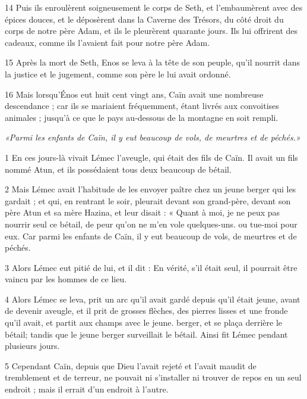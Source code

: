 \par 14 Puis ils enroulèrent soigneusement le corps de Seth, et l'embaumèrent avec des épices douces, et le déposèrent dans la Caverne des Trésors, du côté droit du corps de notre père Adam, et ils le pleurèrent quarante jours. Ils lui offrirent des cadeaux, comme ils l'avaient fait pour notre père Adam.

\par 15 Après la mort de Seth, Enos se leva à la tête de son peuple, qu'il nourrit dans la justice et le jugement, comme son père le lui avait ordonné.

\par 16 Mais lorsqu'Énos eut huit cent vingt ans, Caïn avait une nombreuse descendance ; car ils se mariaient fréquemment, étant livrés aux convoitises animales ; jusqu'à ce que le pays au-dessous de la montagne en soit rempli.


\par \textit{«Parmi les enfants de Caïn, il y eut beaucoup de vols, de meurtres et de péchés.»}

\par 1 En ces jours-là vivait Lémec l'aveugle, qui était des fils de Caïn. Il avait un fils nommé Atun, et ils possédaient tous deux beaucoup de bétail.

\par 2 Mais Lémec avait l'habitude de les envoyer paître chez un jeune berger qui les gardait ; et qui, en rentrant le soir, pleurait devant son grand-père, devant son père Atun et sa mère Hazina, et leur disait : « Quant à moi, je ne peux pas nourrir seul ce bétail, de peur qu'on ne m'en vole quelques-uns. ou tue-moi pour eux. Car parmi les enfants de Caïn, il y eut beaucoup de vols, de meurtres et de péchés.

\par 3 Alors Lémec eut pitié de lui, et il dit : En vérité, s'il était seul, il pourrait être vaincu par les hommes de ce lieu.

\par 4 Alors Lémec se leva, prit un arc qu'il avait gardé depuis qu'il était jeune, avant de devenir aveugle, et il prit de grosses flèches, des pierres lisses et une fronde qu'il avait, et partit aux champs avec le jeune. berger, et se plaça derrière le bétail; tandis que le jeune berger surveillait le bétail. Ainsi fit Lémec pendant plusieurs jours.

\par 5 Cependant Caïn, depuis que Dieu l'avait rejeté et l'avait maudit de tremblement et de terreur, ne pouvait ni s'installer ni trouver de repos en un seul endroit ; mais il errait d'un endroit à l'autre.

